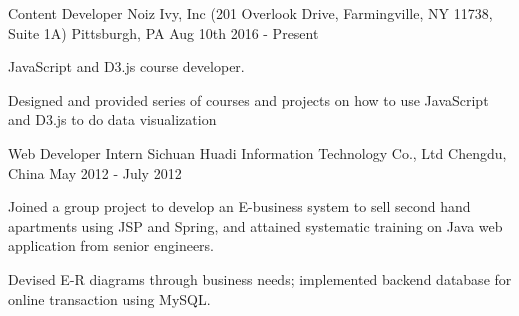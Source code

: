 \begin{cventries}

    \cventry
    {Content Developer} %
    {Noiz Ivy, Inc (201 Overlook Drive, Farmingville, NY 11738, Suite 1A)} %
    {Pittsburgh, PA} %
    {Aug 10th 2016 - Present}  %
    {
      \begin{cvitems}
      	\item {JavaScript and D3.js course developer. }
        \item {Designed and provided series of courses and projects on how to use JavaScript and D3.js to do data visualization}
      \end{cvitems}
    }


  \cventry
    {Web Developer Intern} %
    {Sichuan Huadi Information Technology Co., Ltd} %
    {Chengdu, China} %
    {May 2012 - July 2012}  %
    {
      \begin{cvitems}
      	\item {Joined a group project to develop an E-business system to sell second hand apartments using JSP and Spring, and attained systematic training on Java web application from senior engineers.}
        \item {Devised E-R diagrams through business needs; implemented backend database for online transaction using MySQL.}
      \end{cvitems}
    }
    

\end{cventries}
